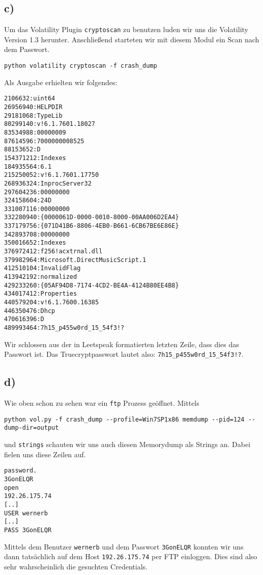 \documentclass[10pt,a4paper]{article}
\begin{document}
\subsection*{c)}
Um das Volatility Plugin \texttt{cryptoscan} zu benutzen luden wir uns die Volatility Version 1.3 herunter. Anschließend starteten wir mit diesem Modul ein Scan nach dem Passwort.
\begin{verbatim}
python volatility cryptoscan -f crash_dump
\end{verbatim}
Als Ausgabe erhielten wir folgendes:
\begin{verbatim}
2106632:uint64
26956940:HELPDIR
29181068:TypeLib
80299140:v!6.1.7601.18027
83534988:00000009
87614596:7000000008525
88153652:D 
154371212:Indexes
184935564:6.1
215250052:v!6.1.7601.17750
268936324:InprocServer32
297604236:00000000
324158604:24D
331007116:00000000
332280940:{0000061D-0000-0010-8000-00AA006D2EA4}
337179756:{071D41B6-8806-4EB0-B661-6CB67BE6E86E}
342893708:00000000
350016652:Indexes
376972412:f256!acxtrnal.dll
379982964:Microsoft.DirectMusicScript.1
412510104:InvalidFlag
413942192:normalized
429233260:{05AF94D8-7174-4CD2-BE4A-4124B80EE4B8}
434017412:Properties
440579204:v!6.1.7600.16385
446350476:Dhcp
470616396:D 
489993464:7h15_p455w0rd_15_54f3!?
\end{verbatim}
Wir schlossen aus der in Leetspeak formatierten letzten Zeile, dass dies das Passwort ist.
Das Truecryptpasswort lautet also:
\texttt{7h15\_p455w0rd\_15\_54f3!?}.

\subsection*{d)}
Wie oben schon zu sehen war ein \texttt{ftp} Prozess geöffnet. Mittels
\begin{verbatim}
python vol.py -f crash_dump --profile=Win7SP1x86 memdump --pid=124 --dump-dir=output
\end{verbatim}
und \texttt{strings}
schauten wir uns auch diesen Memorydump als Strings an. Dabei fielen uns diese Zeilen auf.
\begin{verbatim}
password.
3GonELQR
open
192.26.175.74
[..]
USER wernerb
[..]
PASS 3GonELQR
\end{verbatim}
Mittels dem Benutzer \texttt{wernerb} und dem Passwort \texttt{3GonELQR} konnten wir uns dann tatsächlich auf dem Host \texttt{192.26.175.74} per FTP einloggen. Dies sind also sehr wahrscheinlich die gesuchten Credentials.
\end{document}
